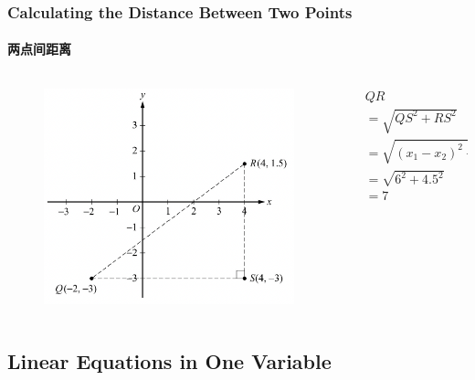 \documentclass[
	11pt, %
	handout,
]{beamer}
\begin{document}
\begin{frame}
	\frametitle{Calculating the Distance Between Two Points}
	\framesubtitle{两点间距离}
	\begin{columns}[t] 
		\begin{column}{0.6\textwidth} %
			\begin{figure}
		    \includegraphics[width=\linewidth]{Distance_Between _Two_Points.png}
		 \end{figure}
		\end{column}
		\begin{column}{0.4 \textwidth} %
			\begin{equation*}
				\begin{aligned}
				&QR\\
				&= \sqrt{QS^2 + RS^2}\\
				&= \sqrt{(x_1 - x_2)^2 + (y_1 - y_2)^2}\\
				&= \sqrt{6^2 + 4.5^2}\\
				&= 7\\
				\end{aligned}
			\end{equation*}

    \end{column}
	\end{columns}
\end{frame}



\subsection{Linear Equations in One Variable}
\end{document}
